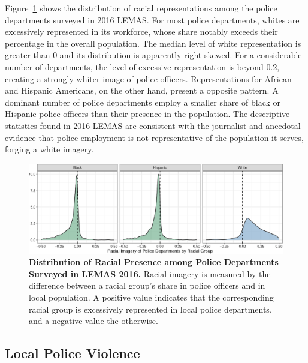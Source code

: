 \documentclass[
  12pt,
]{article}
\begin{document}
Figure~\ref{fig-lemas-density} shows the distribution of racial
representations among the police departments surveyed in 2016 LEMAS. For
most police departments, whites are excessively represented in its
workforce, whose share notably exceeds their percentage in the overall
population. The median level of white representation is greater than 0
and its distribution is apparently right-skewed. For a considerable
number of departments, the level of excessive representation is beyond
0.2, creating a strongly whiter image of police officers.
Representations for African and Hispanic Americans, on the other hand,
present a opposite pattern. A dominant number of police departments
employ a smaller share of black or Hispanic police officers than their
presence in the population. The descriptive statistics found in 2016
LEMAS are consistent with the journalist and anecdotal evidence that
police employment is not representative of the population it serves,
forging a white imagery.

\begin{figure}[tb]

{\centering \includegraphics{racialized-police_files/figure-pdf/fig-lemas-density-1.pdf}

}

\caption{\label{fig-lemas-density}\textbf{Distribution of Racial
Presence among Police Departments Surveyed in LEMAS 2016.} Racial
imagery is measured by the difference between a racial group's share in
police officers and in local population. A positive value indicates that
the corresponding racial group is excessively represented in local
police departments, and a negative value the otherwise.}

\end{figure}

\hypertarget{local-police-violence}{%
\subsection{Local Police Violence}\label{local-police-violence}}
\end{document}
